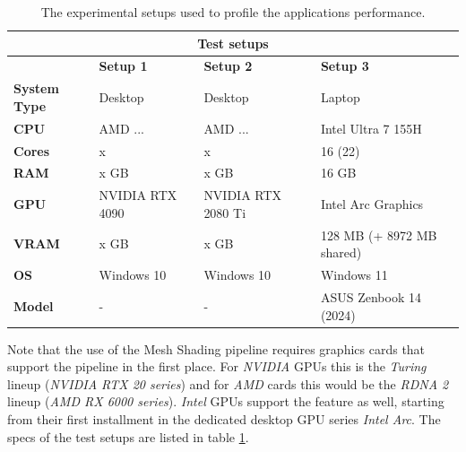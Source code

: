 \begin{table}[h]
    \begin{tabular}{|llll|}
        \hline
        \multicolumn{4}{|c|}{\textbf{Test setups}}                                                                                                               \\ \hline
        \multicolumn{1}{|l|}{}                     & \multicolumn{1}{l|}{\textbf{Setup 1}} & \multicolumn{1}{l|}{\textbf{Setup 2}}   & \textbf{Setup 3}          \\ \hline
        \multicolumn{1}{|l|}{\textbf{System Type}} & \multicolumn{1}{l|}{Desktop}          & \multicolumn{1}{l|}{Desktop}            & Laptop                    \\
        \multicolumn{1}{|l|}{\textbf{CPU}}         & \multicolumn{1}{l|}{AMD ...}          & \multicolumn{1}{l|}{AMD ...}            & Intel Ultra 7 155H        \\
        \multicolumn{1}{|l|}{\textbf{Cores}}       & \multicolumn{1}{l|}{x}                & \multicolumn{1}{l|}{x}                  & 16 (22)                   \\
        \multicolumn{1}{|l|}{\textbf{RAM}}         & \multicolumn{1}{l|}{x GB}             & \multicolumn{1}{l|}{x GB}               & 16 GB                     \\
        \multicolumn{1}{|l|}{\textbf{GPU}}         & \multicolumn{1}{l|}{NVIDIA RTX 4090}  & \multicolumn{1}{l|}{NVIDIA RTX 2080 Ti} & Intel Arc Graphics        \\
        \multicolumn{1}{|l|}{\textbf{VRAM}}        & \multicolumn{1}{l|}{x GB}             & \multicolumn{1}{l|}{x GB}               & 128 MB (+ 8972 MB shared) \\
        \multicolumn{1}{|l|}{\textbf{OS}}          & \multicolumn{1}{l|}{Windows 10}       & \multicolumn{1}{l|}{Windows 10}         & Windows 11                \\
        \multicolumn{1}{|l|}{\textbf{Model}}       & \multicolumn{1}{l|}{-}                & \multicolumn{1}{l|}{-}                  & ASUS Zenbook 14 (2024)    \\ \hline
    \end{tabular}
    \caption{The experimental setups used to profile the applications performance.}
    \label{tbl:hardware-setup}
\end{table}

\noindent
Note that the use of the Mesh Shading pipeline requires graphics cards that support the pipeline in the first place. 
For \emph{NVIDIA} \ac{GPU}s this is the \emph{Turing} lineup (\emph{NVIDIA RTX 20 series}) and for \emph{AMD} cards 
this would be the \emph{RDNA 2} lineup (\emph{AMD RX 6000 series}). \emph{Intel} \ac{GPU}s support the feature as 
well, starting from their first installment in the dedicated desktop \ac{GPU} series \emph{Intel Arc}. The specs of 
the test setups are listed in table \ref{tbl:hardware-setup}. \\

